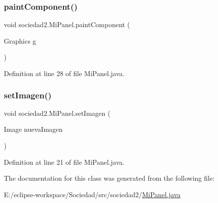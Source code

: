 \subsubsection{\texorpdfstring{paint\+Component()}{paintComponent()}}
{\footnotesize\ttfamily void sociedad2.\+Mi\+Panel.\+paint\+Component (\begin{DoxyParamCaption}\item[{Graphics}]{g }\end{DoxyParamCaption})\hspace{0.3cm}{\ttfamily [protected]}}



Definition at line 28 of file Mi\+Panel.\+java.

\mbox{\label{classsociedad2_1_1_mi_panel_a94a0438f3a9cdbb34b254eed58037304}} 
\subsubsection{\texorpdfstring{set\+Imagen()}{setImagen()}}
{\footnotesize\ttfamily void sociedad2.\+Mi\+Panel.\+set\+Imagen (\begin{DoxyParamCaption}\item[{Image}]{nueva\+Imagen }\end{DoxyParamCaption})}



Definition at line 21 of file Mi\+Panel.\+java.



The documentation for this class was generated from the following file\+:\begin{DoxyCompactItemize}
\item 
E\+:/eclipse-\/workspace/\+Sociedad/src/sociedad2/\mbox{\hyperlink{_mi_panel_8java}{Mi\+Panel.\+java}}\end{DoxyCompactItemize}
